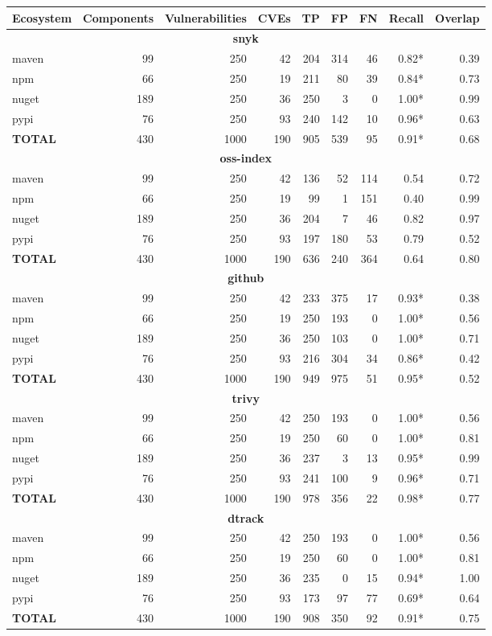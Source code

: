 \begin{table}[!t]
\centering
\small
\begin{tabular}{lrrrrrrrr}
\toprule
Ecosystem & Components & Vulnerabilities & CVEs & TP & FP & FN & Recall & Overlap \\
\midrule
\multicolumn{9}{c}{\textbf{snyk}} \\
\midrule
maven & 99 & 250 & 42 & 204 & 314 & 46 & 0.82* & 0.39 \\
npm & 66 & 250 & 19 & 211 & 80 & 39 & 0.84* & 0.73 \\
nuget & 189 & 250 & 36 & 250 & 3 & 0 & 1.00* & 0.99 \\
pypi & 76 & 250 & 93 & 240 & 142 & 10 & 0.96* & 0.63 \\
\midrule
\textbf{TOTAL} & 430 & 1000 & 190 & 905 & 539 & 95 & 0.91* & 0.68 \\
\midrule
\multicolumn{9}{c}{\textbf{oss-index}} \\
\midrule
maven & 99 & 250 & 42 & 136 & 52 & 114 & 0.54 & 0.72 \\
npm & 66 & 250 & 19 & 99 & 1 & 151 & 0.40 & 0.99 \\
nuget & 189 & 250 & 36 & 204 & 7 & 46 & 0.82 & 0.97 \\
pypi & 76 & 250 & 93 & 197 & 180 & 53 & 0.79 & 0.52 \\
\midrule
\textbf{TOTAL} & 430 & 1000 & 190 & 636 & 240 & 364 & 0.64 & 0.80 \\
\midrule
\multicolumn{9}{c}{\textbf{github}} \\
\midrule
maven & 99 & 250 & 42 & 233 & 375 & 17 & 0.93* & 0.38 \\
npm & 66 & 250 & 19 & 250 & 193 & 0 & 1.00* & 0.56 \\
nuget & 189 & 250 & 36 & 250 & 103 & 0 & 1.00* & 0.71 \\
pypi & 76 & 250 & 93 & 216 & 304 & 34 & 0.86* & 0.42 \\
\midrule
\textbf{TOTAL} & 430 & 1000 & 190 & 949 & 975 & 51 & 0.95* & 0.52 \\
\midrule
\multicolumn{9}{c}{\textbf{trivy}} \\
\midrule
maven & 99 & 250 & 42 & 250 & 193 & 0 & 1.00* & 0.56 \\
npm & 66 & 250 & 19 & 250 & 60 & 0 & 1.00* & 0.81 \\
nuget & 189 & 250 & 36 & 237 & 3 & 13 & 0.95* & 0.99 \\
pypi & 76 & 250 & 93 & 241 & 100 & 9 & 0.96* & 0.71 \\
\midrule
\textbf{TOTAL} & 430 & 1000 & 190 & 978 & 356 & 22 & 0.98* & 0.77 \\
\midrule
\multicolumn{9}{c}{\textbf{dtrack}} \\
\midrule
maven & 99 & 250 & 42 & 250 & 193 & 0 & 1.00* & 0.56 \\
npm & 66 & 250 & 19 & 250 & 60 & 0 & 1.00* & 0.81 \\
nuget & 189 & 250 & 36 & 235 & 0 & 15 & 0.94* & 1.00 \\
pypi & 76 & 250 & 93 & 173 & 97 & 77 & 0.69* & 0.64 \\
\midrule
\textbf{TOTAL} & 430 & 1000 & 190 & 908 & 350 & 92 & 0.91* & 0.75 \\
\midrule
\bottomrule
\end{tabular}
\end{table}
